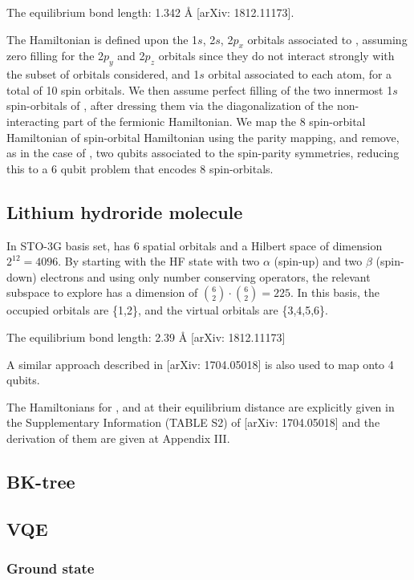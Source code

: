\documentclass[11pt, oneside]{article}   	%
\begin{document}
The equilibrium bond length: 1.342 \si{\angstrom} [arXiv: 1812.11173].

The  Hamiltonian is defined upon the 1$s$, 2$s$, 2$p_x$ orbitals associated to , assuming zero filling for the 2$p_y$ and 2$p_z$ orbitals since they do not interact strongly with the subset of orbitals considered, and 1$s$ orbital associated to each  atom, for a total of 10 spin orbitals. 
We then assume perfect filling of the two innermost 1$s$ spin-orbitals of , after dressing them via the diagonalization of the non-interacting part of the fermionic Hamiltonian. 
We map the 8 spin-orbital Hamiltonian of  spin-orbital Hamiltonian using the parity mapping, and remove, as in the case of , two qubits associated to the spin-parity symmetries, 
reducing this to a 6 qubit problem that encodes 8 spin-orbitals. 



\subsection{Lithium hydroride molecule}
In STO-3G basis set,  has 6 spatial orbitals and a Hilbert space of dimension $2^{12} = 4096$. 
By starting with the HF state with two $\alpha$ (spin-up) and two $\beta$ (spin-down) electrons and using only number conserving operators, the relevant subspace to explore has a dimension of 
$\binom{6}{2} \cdot \binom{6}{2} = 225$. 
In this basis, the occupied orbitals are \{1,2\}, and the virtual orbitals are \{3,4,5,6\}.

The equilibrium bond length: 2.39 \si{\angstrom} [arXiv: 1812.11173]

A similar approach described in [arXiv: 1704.05018] is also used to map  onto 4 qubits. 

The Hamiltonians for ,  and  at their equilibrium distance are explicitly given in the Supplementary Information (TABLE S2) of [arXiv: 1704.05018] and the derivation of them are given at Appendix III.



\subsection{BK-tree}

\subsection{VQE}
\subsubsection{Ground state}
\end{document}
